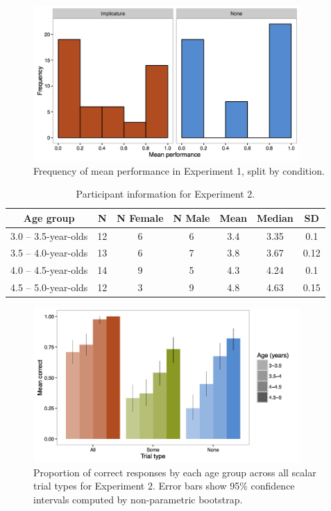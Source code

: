 \documentclass[man]{apa2}
\begin{document}
\begin{figure}
 \begin{center}
  \includegraphics[width=4in]{figures/exp1_hist.png}
  \caption{\label{fig:imp_hist} Frequency of mean performance in Experiment 1, split by condition.}
 \end{center}
\end{figure}

\begin{table}
\centering
\begin{tabular}{ccccccc}
\hline
{\bf Age group} & {\bf N} & {\bf N Female} & {\bf N Male} & {\bf Mean} & {\bf Median} & {\bf SD} \\
\hline
3.0 -- 3.5-year-olds & 12 & 6 & 6 & 3.4 & 3.35 & 0.1\\
3.5 -- 4.0-year-olds & 13 & 6 & 7 & 3.8 & 3.67 & 0.12\\
4.0 -- 4.5-year-olds & 14 & 9 & 5 & 4.3 & 4.24 & 0.1\\
4.5 -- 5.0-year-olds & 12 & 3 & 9 & 4.8 & 4.63 & 0.15\\
\hline
\end{tabular}
\caption{\label{tab:exp_2_demo}Participant information for Experiment 2.}
\end{table}

\begin{figure}
 \begin{center}
  \includegraphics[width=4in]{figures/exp2_performance.png}
  \caption{\label{fig:exp2_perf} Proportion of correct responses by each age group across all scalar trial types for Experiment 2. Error bars show 95\% confidence intervals computed by non-parametric bootstrap.}
 \end{center}
\end{figure}
\end{document}
